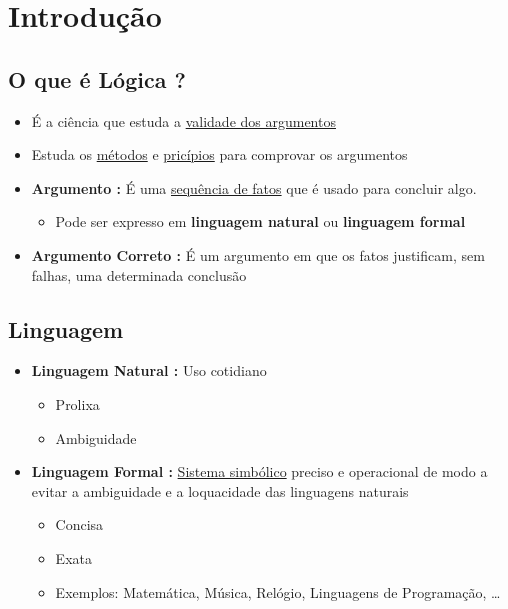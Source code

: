 \section{Introdução}

    \subsection{O que é Lógica ?}
    
        \begin{itemize}[left=0.5cm, align=left, nosep]
            \item É a ciência que estuda a \underline{validade dos argumentos} 
            \item Estuda os \underline{métodos} e \underline{pricípios} para comprovar os argumentos
            \item \textbf{Argumento :} É uma \underline{sequência de fatos} que é usado para concluir algo.   
            \begin{itemize}[left=0.5cm, nosep, label=$\hookrightarrow$]
                \item Pode ser expresso em \textbf{linguagem natural} ou \textbf{linguagem formal}
            \end{itemize}
            \item \textbf{Argumento Correto :} É um argumento em que os fatos justificam, sem falhas, uma 
            determinada conclusão
        \end{itemize}
   
    \subsection{Linguagem}
        \begin{itemize}[left=0.5cm, align=left, nosep]
            \item \textbf{Linguagem Natural :} Uso cotidiano
            \begin{itemize}[left=0.5cm, nosep, label=$\hookrightarrow$]
                \item Prolixa
                \item Ambiguidade
            \end{itemize}
        
            \item \textbf{Linguagem Formal :} \underline{Sistema simbólico} preciso e operacional de modo a evitar a ambiguidade e a loquacidade das linguagens naturais
            \begin{itemize}[left=0.5cm, nosep, label=$\hookrightarrow$]
                \item Concisa
                \item Exata
                \item Exemplos: Matemática, Música, Relógio, Linguagens de Programação, \dots  
            \end{itemize}
        
        \end{itemize}        

